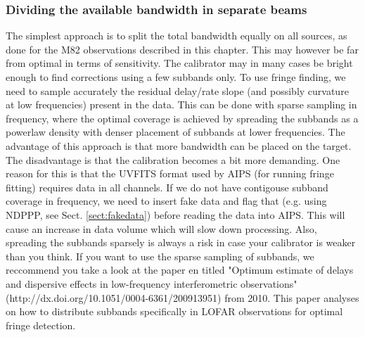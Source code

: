 \subsubsection{Dividing the available bandwidth in separate beams}
The simplest approach is to split the total bandwidth equally on all
sources, as done for the M82 observations described in this chapter. 
This may however be far from optimal in terms of sensitivity. The calibrator
may in many cases be bright enough to find corrections using a few subbands only. 
To use fringe finding, we need to sample
accurately the residual delay/rate slope (and possibly curvature at low
frequencies) present in the data. This can be done with sparse sampling in
frequency, where the optimal coverage is achieved by spreading the subbands as
a powerlaw density with denser placement of subbands at lower frequencies. The
advantage of this approach is that more bandwidth can be placed on the target.
The disadvantage is that the calibration becomes a bit more demanding. One
reason for this is that the UVFITS format used by AIPS (for running fringe
fitting) requires data in all channels.  If we do not have contigouse subband
coverage in frequency, we need to insert fake data and flag that (e.g. using
NDPPP, see Sect. \ref{sect:fakedata}) before reading the data into AIPS. This
will cause an increase in data volume which will slow down processing. Also,
spreading the subbands sparsely is always a risk in case your calibrator is
weaker than you think.  If you want to use the sparse sampling of subbands, we
reccommend you take a look at the paper en titled "Optimum estimate of delays
and dispersive effects in low-frequency interferometric observations"
(http://dx.doi.org/10.1051/0004-6361/200913951) from 2010. This paper analyses
on how to distribute subbands specifically in LOFAR observations for optimal
fringe detection.
